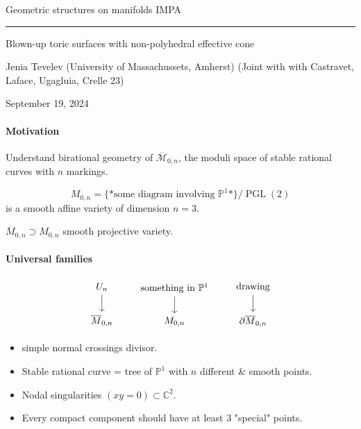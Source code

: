 



\begin{minipage}{\textwidth}
	\begin{minipage}{1\textwidth}
		Geometric structures on manifolds \hfill IMPA
		
	\end{minipage}
\end{minipage}\vspace{.2cm}\hrule

\vspace{10pt}

{\Huge Blown-up toric surfaces with non-polyhedral effective cone}

\hfill{\Large Jenia Tevelev (University of Massachussets, Amherst)}
\hfill{\Large (Joint with with Castravet, Laface, Ugagluia, Crelle 23)}

\hfill{\large September 19, 2024}

\tableofcontents

\paragraph{Motivation} Understand birational geometry of $\overline{\mathcal{M}}_{0,n}$, the moduli space of stable rational curves with $n$ markings.

\[M_{0,n}=\{\text{*some diagram involving $\mathbb{P}^1$*} \} /\operatorname{PGL}(2)\]
is a smooth affine variety of dimension $n=3$.

 $\overline{M}_{0,n}\supset M_{0,n}$ smooth projective variety.

\paragraph{Universal families} 
\[\begin{tikzcd}
U_{n}\arrow[d]\\
\overline{M}_{0,n}
\end{tikzcd}\qquad \begin{tikzcd}
\text{something in } \mathbb{P}^1\arrow[d]\\
M_{0,n}
\end{tikzcd}\qquad \begin{tikzcd}
\text{drawing} \arrow[d]\\
\partial\overline{M}_{0,n}
\end{tikzcd}\]
 \begin{itemize}
 \item simple normal crossings divisor.
 \item Stable rational curve = tree of $\mathbb{P}^1$ with $n$ different \& smooth points.
\item Nodal singularities $(xy=0)\subset \mathbb{C}^2$.
\item Every compact component should have at least 3 "special" points.
 \end{itemize}

